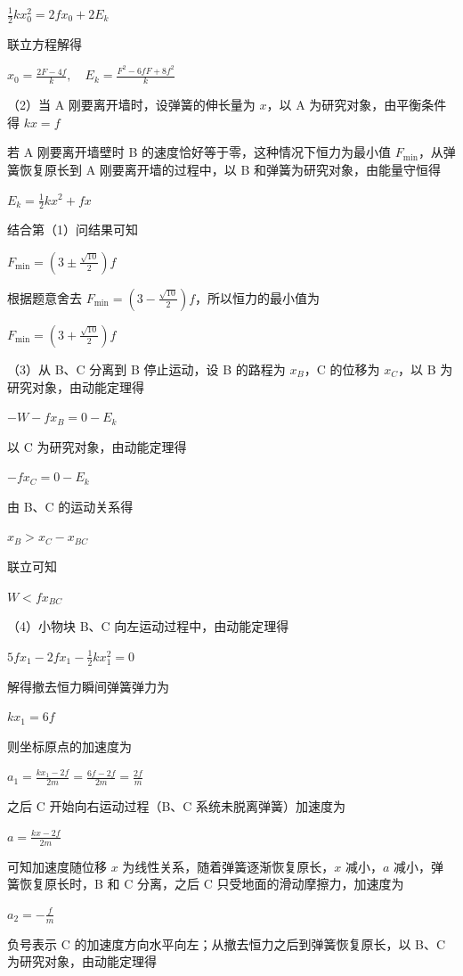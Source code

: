 \documentclass[\gkver]{gaokaozhenti}
\begin{document}
\begin{enumerate}
{$\frac{1}{2}kx_{0}^{2} = 2fx_{0} + 2E_{k}$

联立方程解得

$x_{0} = \frac{2F - 4f}{k}, \quad E_{k} = \frac{F^{2} - 6fF + 8f^{2}}{k}$

（2）当 A 刚要离开墙时，设弹簧的伸长量为 $x$，以 A 为研究对象，由平衡条件得 $kx = f$

若 A 刚要离开墙壁时 B 的速度恰好等于零，这种情况下恒力为最小值 $F_{\min}$，从弹簧恢复原长到 A 刚要离开墙的过程中，以 B 和弹簧为研究对象，由能量守恒得

$E_{k} = \frac{1}{2}kx^{2} + fx$

结合第（1）问结果可知

$F_{\min} = \left(3 \pm \frac{\sqrt{10}}{2}\right)f$

根据题意舍去 $F_{\min} = \left(3 - \frac{\sqrt{10}}{2}\right)f$，所以恒力的最小值为

$F_{\min} = \left(3 + \frac{\sqrt{10}}{2}\right)f$

（3）从 B、C 分离到 B 停止运动，设 B 的路程为 $x_{B}$，C 的位移为 $x_{C}$，以 B 为研究对象，由动能定理得

$-W - fx_{B} = 0 - E_{k}$

以 C 为研究对象，由动能定理得

$-fx_{C} = 0 - E_{k}$

由 B、C 的运动关系得

$x_{B} > x_{C} - x_{BC}$

联立可知

$W < fx_{BC}$

（4）小物块 B、C 向左运动过程中，由动能定理得

$5fx_{1} - 2fx_{1} - \frac{1}{2}kx_{1}^{2} = 0$

解得撤去恒力瞬间弹簧弹力为

$kx_{1} = 6f$

则坐标原点的加速度为

$a_{1} = \frac{kx_{1} - 2f}{2m} = \frac{6f - 2f}{2m} = \frac{2f}{m}$

之后 C 开始向右运动过程（B、C 系统未脱离弹簧）加速度为

$a = \frac{kx - 2f}{2m}$

可知加速度随位移 $x$ 为线性关系，随着弹簧逐渐恢复原长，$x$ 减小，$a$ 减小，弹簧恢复原长时，B 和 C 分离，之后 C 只受地面的滑动摩擦力，加速度为

$a_{2} = -\frac{f}{m}$

负号表示 C 的加速度方向水平向左；从撤去恒力之后到弹簧恢复原长，以 B、C 为研究对象，由动能定理得

}
\end{enumerate}
\end{document}

